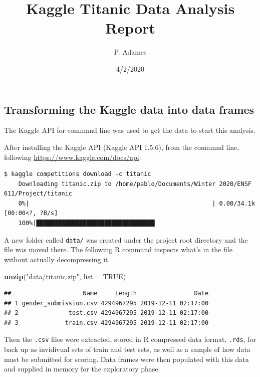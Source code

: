 \documentclass[]{article}
\title{Kaggle Titanic Data Analysis Report}
\author{P. Adames}
\date{4/2/2020}
\newenvironment{Shaded}{\begin{snugshade}}{\end{snugshade}}
\newcommand{\DataTypeTok}[1]{\textcolor[rgb]{0.13,0.29,0.53}{#1}}
\newcommand{\KeywordTok}[1]{\textcolor[rgb]{0.13,0.29,0.53}{\textbf{#1}}}
\newcommand{\NormalTok}[1]{#1}
\newcommand{\OtherTok}[1]{\textcolor[rgb]{0.56,0.35,0.01}{#1}}
\newcommand{\StringTok}[1]{\textcolor[rgb]{0.31,0.60,0.02}{#1}}
\begin{document}
\maketitle

\hypertarget{transforming-the-kaggle-data-into-data-frames}{%
\subsection{Transforming the Kaggle data into data
frames}\label{transforming-the-kaggle-data-into-data-frames}}

The Kaggle API for command line was used to get the data to start this
analysis.

After installing the Kaggle API (Kaggle API 1.5.6), from the comamnd
line, following \url{https://www.kaggle.com/docs/api}:

\begin{verbatim}
$ kaggle competitions download -c titanic
    Downloading titanic.zip to /home/pablo/Documents/Winter 2020/ENSF 611/Project/titanic
    0%|                                                   | 0.00/34.1k [00:00<?, ?B/s]
    100%|█████████████████████████████████
\end{verbatim}

A new folder called \texttt{data/} was created under the project root
directory and the file was moved there. The following R command inspects
what's in the file without actually decompressing it.

\begin{Shaded}
\begin{Highlighting}[]
\KeywordTok{unzip}\NormalTok{(}\StringTok{"data/titanic.zip"}\NormalTok{, }\DataTypeTok{list =} \OtherTok{TRUE}\NormalTok{)}
\end{Highlighting}
\end{Shaded}

\begin{verbatim}
##                    Name     Length                Date
## 1 gender_submission.csv 4294967295 2019-12-11 02:17:00
## 2              test.csv 4294967295 2019-12-11 02:17:00
## 3             train.csv 4294967295 2019-12-11 02:17:00
\end{verbatim}

Then the \texttt{.csv} files were extracted, stored in R compressed data
format, \texttt{.rds}, for back up as invidivual sets of train and test
sets, as well as a sample of how data must be submitted for scoring.
Data frames were then populated with this data and supplied in memory
for the exploratory phase.
\end{document}
